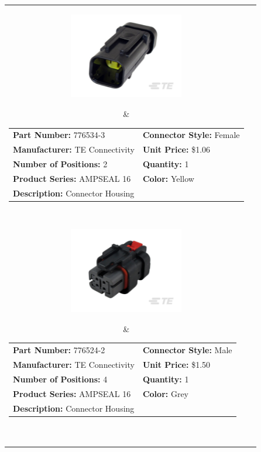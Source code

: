 \documentclass[12pt,letterpaper]{article}
\begin{document}
\begin{longtable}{c l}
\parbox[c]{5cm}{\includegraphics[width=5cm]{776534-3.png} }
& \begin{tabular}{l l}
\textbf{Part Number:} 776534-3 & \textbf{Connector Style:} Female \\
\textbf{Manufacturer:} TE Connectivity & \textbf{Unit Price:} \$1.06 \\
\textbf{Number of Positions:} 2 & \textbf{Quantity:} 1 \\
\textbf{Product Series:} AMPSEAL 16 & \textbf{Color:} Yellow \\
\textbf{Description:} Connector Housing & \\
\end{tabular} \\

\parbox[c]{5cm}{\includegraphics[width=5cm]{776524-2.png} }
& \begin{tabular}{l l}
\textbf{Part Number:} 776524-2 & \textbf{Connector Style:} Male \\
\textbf{Manufacturer:} TE Connectivity & \textbf{Unit Price:} \$1.50 \\
\textbf{Number of Positions:} 4 & \textbf{Quantity:} 1 \\
\textbf{Product Series:} AMPSEAL 16 & \textbf{Color:} Grey \\
\textbf{Description:} Connector Housing & \\
\end{tabular} \\


\end{longtable}
\end{document}
